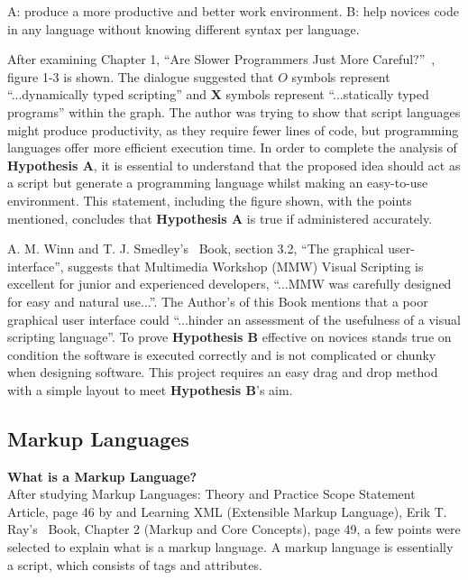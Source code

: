 \documentclass[conference]{IEEEtran}
\begin{document}
        \begin{center}
           A: produce a more productive and better work environment.
           B: help novices code in any language without knowing different syntax per language.
        \end{center}
        
        After examining Chapter 1, ``Are Slower Programmers Just More Careful?''~\cite{dr_caitlin_sadowski_rethinking_2019}, figure 1-3 is shown. The dialogue suggested that $O$ symbols represent ``...dynamically typed scripting'' and $\mathbf{X}$ symbols represent ``...statically typed programs'' within the graph. The author was trying to show that script languages might produce productivity, as they require fewer lines of code, but programming languages offer more efficient execution time. In order to complete the analysis of \textbf{Hypothesis A}, it is essential to understand that the proposed idea should act as a script but generate a programming language whilst making an easy-to-use environment. This statement, including the figure shown, with the points mentioned, concludes that \textbf{Hypothesis A} is true if administered accurately.

        A. M. Winn and T. J. Smedley’s~\cite{winn_multimedia_1998} Book, section 3.2, ``The graphical user-interface'',  suggests that Multimedia Workshop (MMW) Visual Scripting is excellent for junior and experienced developers, ``...MMW was carefully designed for easy and natural use...''. The Author’s of this Book mentions that a poor graphical user interface could ``...hinder an assessment of the usefulness of a visual scripting language''. To prove \textbf{Hypothesis B} effective on novices stands true on condition the software is executed correctly and is not complicated or chunky when designing software. This project requires an easy drag and drop method with a simple layout to meet \textbf{Hypothesis B}’s aim.

      \subsection{Markup Languages}
      \label{subsec:lr-markupLanguages}
        \textbf{What is a Markup Language?}\\
          After studying Markup Languages: Theory and Practice Scope Statement~\cite{noauthor_markup_1999} Article, page 46 by and Learning XML (Extensible Markup Language), Erik T. Ray's~\cite{ray_learning_nodate} Book, Chapter 2 (Markup and Core Concepts), page 49, a few points were selected to explain what is a markup language. A markup language is essentially a script, which consists of tags and attributes. 
\end{document}
